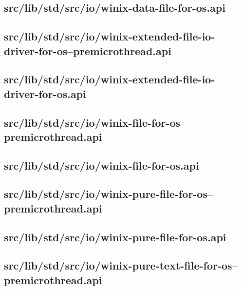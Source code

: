 \subsection{src/lib/std/src/io/winix-data-file-for-os.api}


\subsection{src/lib/std/src/io/winix-extended-file-io-driver-for-os--premicrothread.api}


\subsection{src/lib/std/src/io/winix-extended-file-io-driver-for-os.api}


\subsection{src/lib/std/src/io/winix-file-for-os--premicrothread.api}


\subsection{src/lib/std/src/io/winix-file-for-os.api}


\subsection{src/lib/std/src/io/winix-pure-file-for-os--premicrothread.api}


\subsection{src/lib/std/src/io/winix-pure-file-for-os.api}


\subsection{src/lib/std/src/io/winix-pure-text-file-for-os--premicrothread.api}


